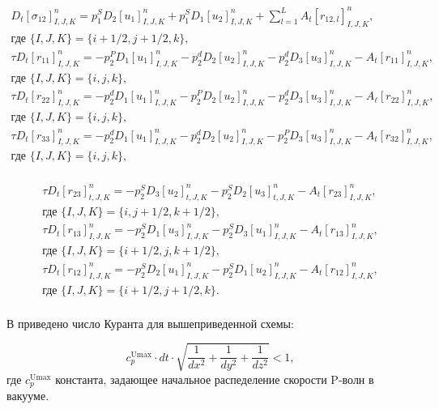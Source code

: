 \documentclass[a4paper, fontsize=14pt]{article}
\begin{document}
\begin{gather*}
        D_{t}[\sigma_{12}]_{I,J,K}^{n}=p_{1}^{S}D_{2}[u_{1}]_{I,J,K}^{n}+p_{1}^{S}D_{1}[u_{2}]_{I,J,K}^{n}+\sum_{l=1}^{L}A_{t}[r_{12,l}]_{I,J,K}^{n}, \\ \text{где } \{I,J,K\}=\{i+1/2,j+1/2,k\},\\ 
        \tau D_{t}[r_{11}]_{I,J,K}^{n}=-p_{2}^{P}D_{1}[u_1]_{I,J,K}^{n}-p_{2}^{d}D_{2}[u_{2}]_{I,J,K}^{n}-p_{2}^{d}D_{3}[u_{3}]_{I,J,K}^{n}  - A_{t}[r_{11}]_{I,J,K}^{n}, \\ \text{где }\{I,J,K\}=\{i,j,k\},\\ 
        \tau D_{t}[r_{22}]_{I,J,K}^{n}=-p_{2}^{d}D_{1}[u_{1}]_{I,J,K}^{n}-p_{2}^{P}D_{2}[u_{2}]_{I,J,K}^{n}-p_{2}^{d}D_{3}[u_{3}]_{I,J,K}^{n}- A_{\ell}[r_{22}]_{I,J,K}^{n}, \\ \text{где }\{I,J,K\}=\{i,j,k\},\\ 
        \tau D_{t}[r_{33}]_{I,J,K}^{n}=-p_{2}^{d}D_{1}[u_{1}]_{I,J,K}^{n}-p_{2}^{d}D_{2}[u_{2}]_{I,J,K}^{n}-p_{2}^{P}D_{3}[u_{3}]_{I,J,K}^{n}- A_{t}[r_{32}]_{I,J,K}^{n}, \\ \text{где }\{I,J,K\}=\{i,j,k\},\\ 
    \end{gather*}

    \begin{gather*}
        \tau D_{t}[r_{23}]_{t,J,K}^{n}=-p_{2}^{S}D_{3}[u_{2}]_{t,J,K}^{n}-p_{2}^{S}D_{2}[u_{3}]_{t,J,K}^{n}-A_{t}[r_{23}]_{I,J,K}^{n},\\ \text{где }\{I,J,K\}=\{i,j+1/2,k+1/2\},\\ 
        \tau D_{t}[r_{13}]_{I,J,K}^{n}=-p_{2}^{S}D_{1}[u_{3}]_{I,J,K}^{n}-p_{2}^{S}D_{3}[u_{1}]_{I,J,K}^{n}-A_{t}[r_{13}]_{I,J,K}^{n},\\ \text{где }\{I,J,K\}=\{i+1/2,j,k+1/2\},\\ 
        \tau D_{t}[r_{12}]_{I,J,K}^{n}=-p_{2}^{S}D_{2}[u_{1}]_{I,J,K}^{n}-p_{2}^{S}D_{1}[u_{2}]_{I,J,K}^{n}-A_{t}[r_{12}]_{I,J,K}^{n},\\ \text{где }\{I,J,K\}=\{i+1/2,j+1/2,k\}.\\ 
    \end{gather*}

В \cite{Bohlen} приведено число Куранта для вышеприведенной схемы:

\begin{equation}
    c_{p}^{\mathrm{Umax}} \cdot  dt \cdot \sqrt{\frac{1}{dx^2} + \frac{1}{dy^2}  + \frac{1}{dz^2} } < 1,
\end{equation}
где $c_{p}^{\mathrm{Umax}}$ константа, задающее начальное распеделение скорости P-волн в вакууме.
\end{document}
